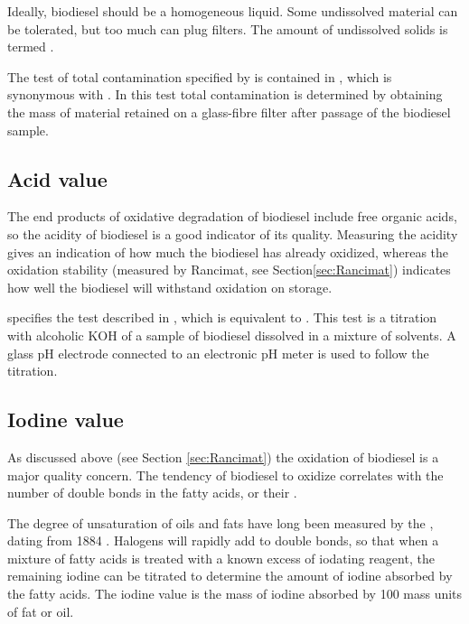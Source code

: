 Ideally, biodiesel should be a homogeneous liquid. Some undissolved material can
be tolerated, but too much can plug filters. The amount of undissolved solids is
termed .

The test of total contamination specified by  is contained in
, which is synonymous with . In this test total
contamination is determined by obtaining the mass of material retained on a
glass-fibre filter after passage of the biodiesel sample.

\subsection{Acid value}

The end products of oxidative degradation of biodiesel include free organic
acids, so the acidity of biodiesel is a good indicator of its quality. Measuring
the acidity gives an indication of how much the biodiesel has already oxidized,
whereas the oxidation stability (measured by Rancimat, see
Section\ref{sec:Rancimat}) indicates how well the biodiesel will withstand
oxidation on storage.

 specifies the test described in , which is
equivalent to . This test is a titration with alcoholic KOH of a
sample of biodiesel dissolved in a mixture of solvents. A glass pH electrode
connected to an electronic pH meter is used to follow the titration.

\subsection{Iodine value}

As discussed above (see Section \ref{sec:Rancimat}) the oxidation of biodiesel
is a major quality concern. The tendency of biodiesel to oxidize correlates with
the number of double bonds in the fatty acids, or their .


The degree of unsaturation of oils and fats have long been measured by the
, dating from 1884 \autocite{Knothe2007}. Halogens will
rapidly add to double bonds, so that when a mixture of fatty acids is treated
with a known excess of iodating reagent, the remaining iodine can be titrated to
determine the amount of iodine absorbed by the fatty acids. The iodine value is
the mass of iodine absorbed by 100 mass units of fat or oil.

